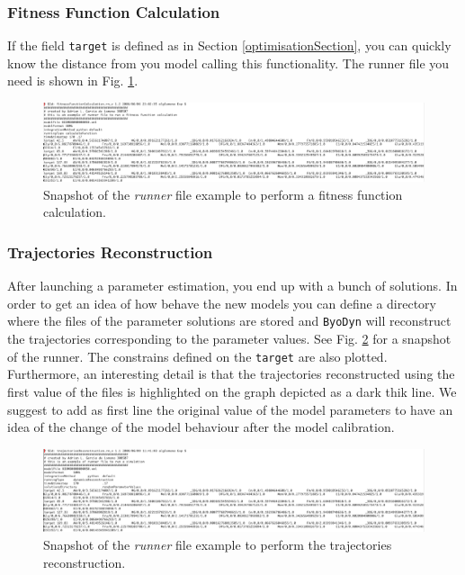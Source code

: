 \documentclass[a4paper, 11pt]{article}
\begin{document}
  \subsubsection{Fitness Function Calculation}
  If the field \texttt{target} is defined as in Section \ref{optimisationSection}, you can quickly know the distance from you model calling this functionality.
  The runner file you need is shown in Fig. \ref{ffcRunner}.
  \begin{figure}[t]
    \begin{center}
      \includegraphics[scale=.38]{figures/ffcRunner.eps}
      \caption{Snapshot of the \emph{runner} file example to perform a fitness function calculation.}
      \label{ffcRunner}
    \end{center}
  \end{figure}
  \subsubsection{Trajectories Reconstruction}
  After launching a parameter estimation, you end up with a bunch of solutions.
  In order to get an idea of how behave the new models you can define a directory where the files of the parameter solutions are stored and \texttt{ByoDyn} will reconstruct the trajectories corresponding to the parameter values.
  See Fig. \ref{trRunner} for a snapshot of the runner.
  The constrains defined on the \texttt{target} are also plotted.
  Furthermore, an interesting detail is that the trajectories reconstructed using the first value of the files is highlighted on the graph depicted as a dark thik line. 
  We suggest to add as first line the original value of the model parameters to have an idea of the change of the model behaviour after the model calibration.
  \begin{figure}[t]
    \begin{center}
      \includegraphics[scale=.38]{figures/trRunner.eps}
      \caption{Snapshot of the \emph{runner} file example to perform the trajectories reconstruction.}
      \label{trRunner}
    \end{center}
  \end{figure}
\end{document}
